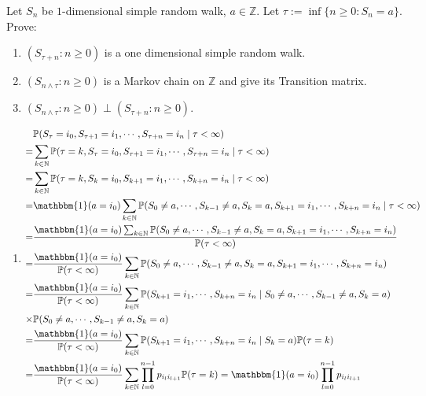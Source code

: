 \documentclass{ctexart}
\begin{document}
\begin{problem}\label{pro:2}
  Let \(S_n\) be \(1\)-dimensional simple random walk, \(a \in \mathbb{Z}\).
  Let \(\tau := \inf \{n \geq 0: S_n =a\}\).
  Prove:
  \begin{enumerate}
    \item \((S_{\tau + n}:n \geq 0)\) is a one dimensional simple random walk.
    \item \((S_{n \wedge \tau }:n \geq 0)\) is a Markov chain on \(\mathbb{Z}\) and give its
      Transition matrix.
    \item \((S_{n \wedge \tau}:n \geq 0) \perp (S_{\tau + n}: n \geq 0)\).
  \end{enumerate}
\end{problem}
\begin{solution}
  \begin{enumerate}
    \item
      \[
        \begin{aligned}
           & \mathbb{P}(S_\tau=i_0,S_{\tau+1}=i_1,\cdots,S_{\tau+n}=i_n \mid \tau<\infty)
          \\= & \sum_{k \in \mathbb{N}}\mathbb{P}(\tau=k,S_\tau=i_0,S_{\tau+1}=i_1,\cdots,S_{\tau+n}=i_n \mid \tau<\infty)
          \\= & \sum_{k \in \mathbb{N}}\mathbb{P}(\tau=k,S_k=i_0,S_{k+1}=i_1,\cdots,S_{k+n}=i_n \mid \tau<\infty)
          \\= & \mathbbm{1}(a=i_0) \sum_{k \in \mathbb{N}}\mathbb{P}(S_0 \neq a,\cdots,S_{k-1}\neq a,S_k=a,S_{k+1}=i_1,\cdots,S_{k+n}=i_n \mid \tau<\infty)
          \\= & \frac{\mathbbm{1}(a=i_0) \sum_{k \in \mathbb{N}}\mathbb{P}(S_0 \neq a,\cdots,S_{k-1}\neq a,S_k=a,S_{k+1}=i_1,\cdots,S_{k+n}=i_n )}{\mathbb{P}(\tau<\infty)}
          \\= & \frac{\mathbbm{1}(a=i_0)}{\mathbb{P}(\tau<\infty)} \sum_{k \in \mathbb{N}}\mathbb{P}(S_0 \neq a,\cdots,S_{k-1}\neq a,S_k=a,S_{k+1}=i_1,\cdots,S_{k+n}=i_n)
          \\= & \frac{\mathbbm{1}(a=i_0)}{\mathbb{P}(\tau<\infty)} \sum_{k \in \mathbb{N}}\mathbb{P}(S_{k+1}=i_1,\cdots,S_{k+n}=i_n \mid S_0 \neq a,\cdots,S_{k-1}\neq a,S_k=a)
          \\ \times & \mathbb{P}(S_0 \neq a,\cdots,S_{k-1}\neq a,S_k=a)
          \\= & \frac{\mathbbm{1}(a=i_0)}{\mathbb{P}(\tau<\infty)} \sum_{k \in \mathbb{N}}\mathbb{P}(S_{k+1}=i_1,\cdots,S_{k+n}=i_n \mid S_k=a) \mathbb{P}(\tau=k)
          \\= & \frac{\mathbbm{1}(a=i_0)}{\mathbb{P}(\tau<\infty)} \sum_{k \in \mathbb{N}}\prod_{l=0}^{n-1} p_{i_l i_{l+1}} \mathbb{P}(\tau=k)=\mathbbm{1}(a=i_0) \prod_{l=0}^{n-1} p_{i_l i_{l+1}}

\end{aligned}\]
\end{enumerate}
\end{solution}
\end{document}
